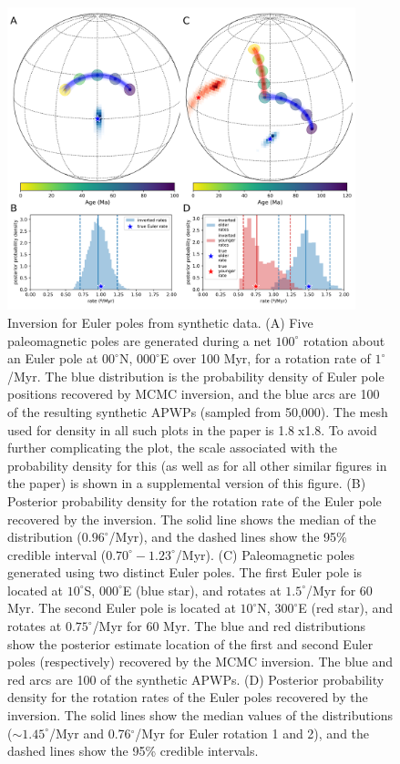 \documentclass[]{agujournal2019}
\begin{document}
\begin{figure}
\centering
\includegraphics[width=0.9\textwidth]{fig_synthetic_pep.png}
\caption{Inversion for Euler poles from synthetic data. (A) Five paleomagnetic poles are generated during a net $100^\circ$ rotation about an Euler pole at $00^\circ$N, $000^\circ$E over 100 Myr, for a rotation rate of $1^\circ$/Myr. The blue distribution is the probability density of Euler pole positions recovered by MCMC inversion, and the blue arcs are 100 of the resulting synthetic APWPs (sampled from 50,000). The mesh used for density in all such plots in the paper is 1.8\textdegree$\;$x1.8\textdegree. To avoid further complicating the plot, the scale associated with the probability density for this (as well as for all other similar figures in the paper) is shown in a supplemental version of this figure. (B) Posterior probability density for the rotation rate of the Euler pole recovered by the inversion. The solid line shows the median of the distribution ($0.96^\circ$/Myr), and the dashed lines show the 95\% credible interval ($0.70^\circ-1.23^\circ$/Myr). (C) Paleomagnetic poles generated using two distinct Euler poles. The first Euler pole is located at $10^\circ$S, $000^\circ$E (blue star), and rotates at $1.5^\circ$/Myr for 60 Myr. The second Euler pole is located at $10^\circ$N, $300^\circ$E (red star), and rotates at $0.75^\circ$/Myr for 60 Myr. The blue and red distributions show the posterior estimate location of the first and second Euler poles (respectively) recovered by the MCMC inversion. The blue and red arcs are 100 of the synthetic APWPs. (D) Posterior probability density for the rotation rates of the Euler poles recovered by the inversion. The solid lines show the median values of the distributions ($\sim 1.45^\circ$/Myr and 0.76$^\circ$/Myr for Euler rotation 1 and 2), and the dashed lines show the 95\% credible intervals.}
\label{fig:synthetic_pep}
\end{figure}
\end{document}
